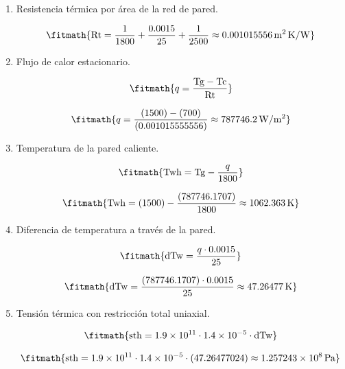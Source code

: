 \begin{enumerate}
\item Resistencia térmica por área de la red de pared.

\[\fitmath{\mathrm{Rt}=\frac{1}{1800}+\frac{0.0015}{25}+\frac{1}{2500}\approx 0.001015556\,\mathrm{m^{2}\,K/W}}\]

\item Flujo de calor estacionario.

\[\fitmath{q=\frac{\mathrm{Tg}-\mathrm{Tc}}{\mathrm{Rt}}}\]

\[\fitmath{q=\frac{(1500)-(700)}{(0.001015555556)}\approx 787746.2\,\mathrm{W/m^{2}}}\]

\item Temperatura de la pared caliente.

\[\fitmath{\mathrm{Twh}=\mathrm{Tg}-\frac{q}{1800}}\]

\[\fitmath{\mathrm{Twh}=(1500)-\frac{(787746.1707)}{1800}\approx 1062.363\,\mathrm{K}}\]

\item Diferencia de temperatura a través de la pared.

\[\fitmath{\mathrm{dTw}=\frac{q\cdot 0.0015}{25}}\]

\[\fitmath{\mathrm{dTw}=\frac{(787746.1707)\cdot 0.0015}{25}\approx 47.26477\,\mathrm{K}}\]

\item Tensión térmica con restricción total uniaxial.

\[\fitmath{\mathrm{sth}=1.9\times10^{11}\cdot 1.4\times10^{-5}\cdot \mathrm{dTw}}\]

\[\fitmath{\mathrm{sth}=1.9\times10^{11}\cdot 1.4\times10^{-5}\cdot (47.26477024)\approx 1.257243\times10^{8}\,\mathrm{Pa}}\]

\end{enumerate}
